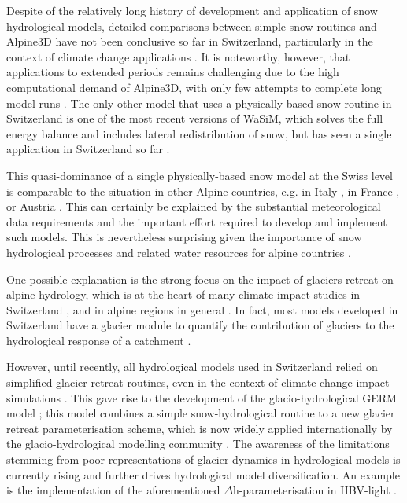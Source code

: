 \documentclass[10pt,a4paper]{article}
\begin{document}
Despite of the relatively long history of development and application of snow hydrological models, detailed comparisons between simple snow routines and Alpine3D have not been conclusive so far in Switzerland, particularly in the context of climate change applications \citep{Kobierska2011, Shakoor2018}. It is noteworthy, however, that applications to extended periods remains challenging due to the high computational demand of Alpine3D, with only few attempts to complete long model runs \citep{Michel2021}. The only other model that uses a physically-based snow routine in Switzerland is one of the most recent versions of WaSiM, which solves the full energy balance and includes lateral redistribution of snow, but has seen a single application in Switzerland so far \citep{Thornton2021}. 

This quasi-dominance of a single physically-based snow model at the Swiss level is comparable to the situation in other Alpine countries, e.g. in Italy \citep[Geotop;][]{Endrizzi2014}, in France \citep[Crocus;][]{Vionnet2012}, or Austria \citep[Admunsen;][]{Strasser2004}. This can certainly be explained by the substantial meteorological data requirements and the important effort required to develop and implement such models. This is nevertheless surprising given the importance of snow hydrological processes and related water resources for alpine countries \citep{Beniston2018}.

One possible explanation is the strong focus on the impact of glaciers retreat on alpine hydrology, which is at the heart of many climate impact studies in Switzerland \citep{Horton2006, Schaefli2007b, Junghans2011, Addor2014, Finger2015, Etter2017}, and in alpine regions in general \citep{Huss2017}. In fact, most models developed in Switzerland have a glacier module to quantify the contribution of glaciers to the hydrological response of a catchment \citep[see for example][]{Finger2011, Verbunt2003, Zappa2007a, Uhlmann2013a}. 
 
However, until recently, all hydrological models used in Switzerland relied on simplified glacier retreat routines, even in the context of climate change impact simulations \citep[e.g.][]{Horton2006}. 
This gave rise to the development of the glacio-hydrological GERM model \citep{Huss2016, Junghans2011, Farinotti2012, Finger2013}; this model combines a simple snow-hydrological routine to a new glacier retreat parameterisation scheme, which is now widely applied internationally by the glacio-hydrological modelling community \citep[][called $\Delta$h-parametrisation]{Huss2010}. The awareness of the limitations stemming from poor representations of glacier dynamics in hydrological models is currently rising and further drives hydrological model diversification. An example is the implementation of the aforementioned $\Delta$h-parameterisation in HBV-light \citep{Seibert2018}. 
\end{document}

